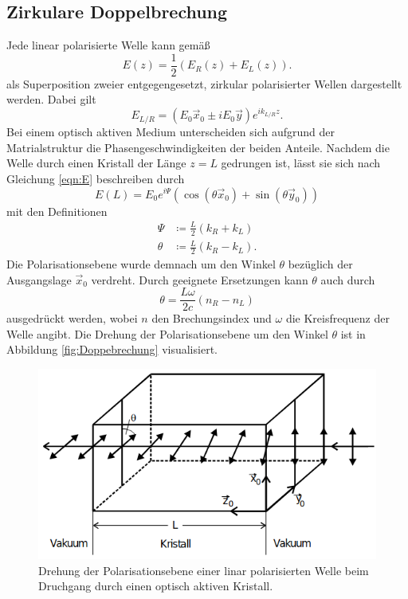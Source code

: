 \subsection{Zirkulare Doppelbrechung}
Jede linear polarisierte Welle kann gemäß
\begin{equation}
    E(z)=\frac{1}{2}(E_R(z)+E_L(z)) . 
    \label{eqn:E}   
\end{equation}
als Superposition zweier entgegengesetzt, zirkular polarisierter Wellen dargestellt werden. Dabei gilt 
\begin{equation*}
    E_{L/R}=(E_0\vec{x}_0\pm iE_0\vec{y})e^{ik_{L/R}z} .
\end{equation*}
Bei einem optisch aktiven Medium unterscheiden sich aufgrund der Matrialstruktur die Phasengeschwindigkeiten der beiden Anteile. 
Nachdem die Welle durch einen Kristall der Länge $z=L$ gedrungen ist, lässt sie sich nach Gleichung \ref{eqn:E} beschreiben durch
\begin{equation*}
    E(L)=E_0e^{i\Psi}(\cos{(\theta\vec{x}_0)}+\sin{(\theta\vec{y}_0)})
\end{equation*}
mit den Definitionen
\begin{align*}
    \Psi  &\coloneqq \frac{L}{2}(k_R+k_L)\\
    \theta&\coloneqq \frac{L}{2}(k_R-k_L) .
\end{align*}
Die Polarisationsebene wurde demnach um den Winkel $\theta$ bezüglich der Ausgangslage $\vec{x}_0$ verdreht. Durch geeignete 
Ersetzungen kann $\theta$ auch durch 
\begin{equation*}
    \theta=\frac{L\omega}{2c}(n_R-n_L)
\end{equation*}
ausgedrückt werden, wobei $n$ den Brechungsindex und $\omega$ die Kreisfrequenz der Welle angibt. Die Drehung der Polarisationsebene
um den Winkel $\theta$ ist in Abbildung \ref{fig:Doppebrechung} visualisiert.
\begin{figure}[H]
    \centering
    \includegraphics[scale=0.6]{pictures/Doppelbrechung.png}
    \caption{Drehung der Polarisationsebene einer linar polarisierten Welle beim Druchgang durch einen optisch aktiven Kristall. \cite{Anhang}}
\end{figure}
